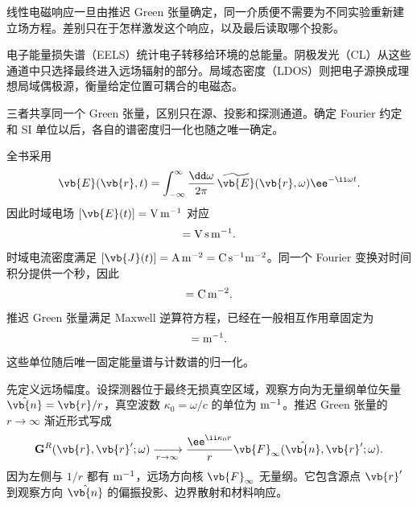
线性电磁响应一旦由推迟 Green 张量确定，同一介质便不需要为不同实验重新建立场方程。差别只在于怎样激发这个响应，以及最后读取哪个投影。

电子能量损失谱（EELS）统计电子转移给环境的总能量。阴极发光（CL）从这些通道中只选择最终进入远场辐射的部分。局域态密度（LDOS）则把电子源换成理想局域偶极源，衡量给定位置可耦合的电磁态。

三者共享同一个 Green 张量，区别只在源、投影和探测通道。确定 Fourier 约定和 SI 单位以后，各自的谱密度归一化也随之唯一确定。

全书采用
\begin{equation*}
\vb{E}(\vb{r},t)
=\int_{-\infty}^{\infty}\frac{\dd\omega}{2\pi}\,
\widetilde{\vb{E}}(\vb{r},\omega)\ee^{-\ii\omega t}.
\end{equation*}
因此时域电场 $[\vb{E}(t)]={\rm V\,m^{-1}}$ 对应
\begin{equation*}
[\widetilde{\vb{E}}(\omega)]={\rm V\,s\,m^{-1}}.
\end{equation*}
时域电流密度满足 $[\vb{J}(t)]={\rm A\,m^{-2}}={\rm C\,s^{-1}m^{-2}}$。同一个 Fourier 变换对时间积分提供一个秒，因此
\begin{equation*}
[\widetilde{\vb{J}}(\vb{r},\omega)]
={\rm C\,m^{-2}}.
\end{equation*}
推迟 Green 张量满足 Maxwell 逆算符方程，已经在一般相互作用章固定为
\begin{equation*}
[\mathbf G^R]={\rm m^{-1}}.
\end{equation*}
这些单位随后唯一固定能量谱与计数谱的归一化。

先定义远场幅度。设探测器位于最终无损真空区域，观察方向为无量纲单位矢量 $\hat{\vb{n}}=\vb{r}/r$，真空波数 $\kappa_0=\omega/c$ 的单位为 ${\rm m^{-1}}$。推迟 Green 张量的 $r\to\infty$ 渐近形式写成
\begin{equation}
{
\mathbf G^R(\vb{r},\vb{r}';\omega)
\xrightarrow[r\to\infty]{}
\frac{\ee^{\ii\kappa_0 r}}{r}
\vb{F}_\infty
(\hat{\vb{n}},\vb{r}';\omega).}
\label{eq:far_field_green_amplitude_definition}
\end{equation}
因为左侧与 $1/r$ 都有 ${\rm m^{-1}}$，远场方向核 $\vb{F}_\infty$ 无量纲。它包含源点 $\vb{r}'$ 到观察方向 $\hat{\vb{n}}$ 的偏振投影、边界散射和材料响应。

